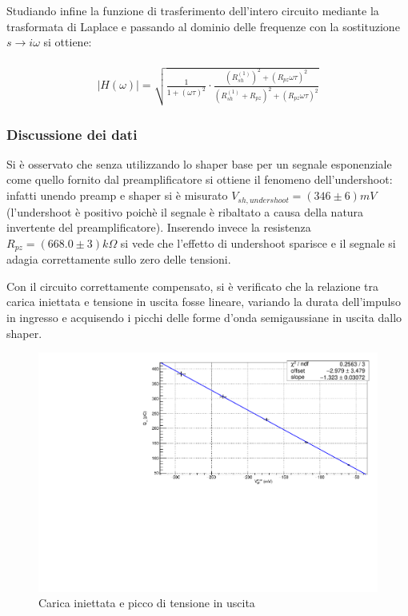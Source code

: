 \documentclass{article}
\begin{document}
Studiando infine la funzione di trasferimento dell'intero circuito  mediante la trasformata di Laplace e passando al dominio delle frequenze con la sostituzione $s\xrightarrow[]{} i\omega$ si ottiene:

\begin{multline}
    \label{eqn:shapercomp_trasf}
    |H(\omega)| =\sqrt{\frac{1}{1+(\omega\tau)^2}\cdot \frac{(R_{sh}^{(1)})^2+(R_{pz}\omega\tau)^2 }{(R_{sh}^{(1)}+R_{pz})^2+(R_{pz}\omega\tau)^2}}
\end{multline}

\subsubsection{Discussione dei dati}

Si è osservato che senza utilizzando lo shaper base per un segnale esponenziale come quello fornito dal preamplificatore si ottiene il 
fenomeno dell'undershoot: infatti unendo preamp e shaper si è misurato $V_{sh, undershoot}=(346 \pm 6)mV$ (l'undershoot è positivo poichè
il segnale è ribaltato a causa della natura invertente del preamplificatore). Inserendo invece la resistenza 
$R_{pz} = (668.0 \pm 3) k\Omega$ si vede che l'effetto di undershoot sparisce e il segnale si adagia correttamente sullo zero 
delle tensioni.

Con il circuito correttamente compensato, si è verificato che la relazione tra carica iniettata e tensione in uscita fosse
lineare, variando la durata dell'impulso in ingresso e acquisendo i picchi delle forme d'onda semigaussiane in uscita dallo shaper.

\begin{center}
    \begin{figure}[H]
    \centering
    \includegraphics[scale=0.375, angle=0]{fitshaper.pdf}
    \caption{Carica iniettata e picco di tensione in uscita}
    \label{fig:fitshaper}
    \end{figure}
\end{center}
\end{document}
